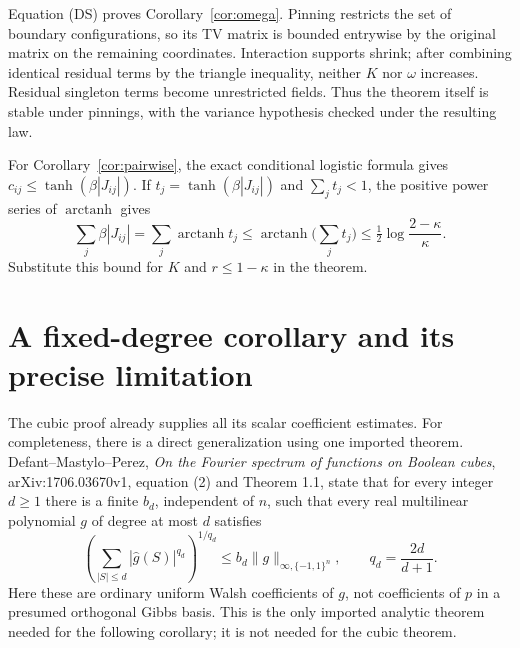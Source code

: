 \documentclass[11pt]{article}
\begin{document}
Equation (DS) proves Corollary~\ref{cor:omega}. Pinning restricts
the set of boundary configurations, so its TV matrix is bounded
entrywise by the original matrix on the remaining coordinates.
Interaction supports shrink; after combining identical residual
terms by the triangle inequality, neither $K$ nor $\omega$ increases.
Residual singleton terms become unrestricted fields. Thus the
theorem itself is stable under pinnings, with the variance hypothesis
checked under the resulting law.

For Corollary~\ref{cor:pairwise}, the exact conditional logistic
formula gives $c_{ij}\le\tanh(\beta|J_{ij}|)$. If
$t_j=\tanh(\beta|J_{ij}|)$ and $\sum_jt_j<1$, the positive power
series of $\operatorname{arctanh}$ gives
\[
 \sum_j\beta|J_{ij}|=\sum_j\operatorname{arctanh}t_j
 \le\operatorname{arctanh}\Big(\sum_jt_j\Big)
 \le\tfrac12\log\frac{2-\kappa}{\kappa}.
\]
Substitute this bound for $K$ and $r\le1-\kappa$ in the theorem.

\section{A fixed-degree corollary and its precise limitation}

The cubic proof already supplies all its scalar coefficient estimates.
For completeness, there is a direct generalization using one imported
theorem. Defant--Mastylo--Perez, \emph{On the Fourier spectrum of
functions on Boolean cubes}, arXiv:1706.03670v1, equation (2) and
Theorem 1.1, state that for every integer $d\ge1$ there is a finite
$b_d$, independent of $n$, such that every real multilinear polynomial
$g$ of degree at most $d$ satisfies
\[
 \left(\sum_{|S|\le d}|\widehat g(S)|^{q_d}\right)^{1/q_d}
 \le b_d\|g\|_{\infty,\{-1,1\}^n},\qquad
 q_d=\frac{2d}{d+1}.
 \tag{BH}
\]
Here these are ordinary uniform Walsh coefficients of $g$, not
coefficients of $p$ in a presumed orthogonal Gibbs basis. This is the
only imported analytic theorem needed for the following corollary;
it is not needed for the cubic theorem.
\end{document}
